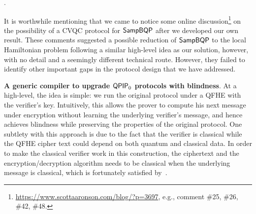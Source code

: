 .



It is worthwhile mentioning that we came to notice some online discussion\footnote{\url{https://www.scottaaronson.com/blog/?p=3697}, e.g., comment \#25, \#26, \#42, \#48. } on the possibility of a CVQC protocol for $\operatorname{\mathsf{SampBQP}}$ after we developed our own result. 
These comments suggested a possible reduction of $\operatorname{\mathsf{SampBQP}}$ to the local Hamiltonian problem following a similar high-level idea as our solution, however, with no detail and a seemingly different technical route. 
However, they failed to identify other important gaps in the protocol design that we have addressed. 

\vspace{2mm} \noindent \textbf{A generic compiler to upgrade $\operatorname{\mathsf{QPIP}}_0$ protocols with blindness}. At a high-level, the idea is simple: we run the original protocol under a QFHE with the verifier's key. Intuitively, this allows the prover to compute his next message under encryption without learning the underlying verifier's message, and hence achieves blindness while preserving the properties of the original protocol.
One subtlety with this approach is due to the fact that the verifier is classical while the QFHE cipher text could depend on both quantum and classical data.
In order to make the classical verifier work in this construction, the ciphertext and the encryption/decryption algorithm needs to be classical when the underlying message is classical, which is fortunately satisfied by~\cite{mahadev_qfhe}.

